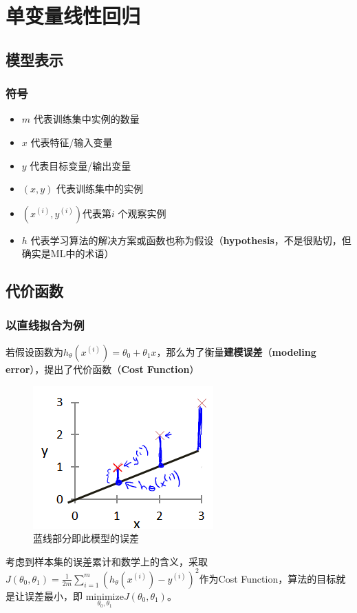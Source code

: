 \documentclass[../main.tex]{subfiles}
\begin{document}
\chapter{单变量线性回归}
\section{模型表示}
\subsection{符号}
\begin{itemize}
    \item \(m\) 代表训练集中实例的数量
    \item \(x\) 代表特征/输入变量
    \item \(y\) 代表目标变量/输出变量
    \item \((x,y)\) 代表训练集中的实例
    \item \(({{x}^{(i)}},{{y}^{(i)}})\)代表第\(i\) 个观察实例
    \item \(h\) 代表学习算法的解决方案或函数也称为假设（\textbf{hypothesis}，不是很贴切，但确实是ML中的术语）
\end{itemize}


\section{代价函数}
\subsection{以直线拟合为例}
若假设函数为\(h_θ(x^{(i)}) = θ_0+θ_1x\)，那么为了衡量\textbf{建模误差}（\textbf{modeling error}），提出了代价函数（\textbf{Cost Function}）

\begin{figure}[H]
    \centering
    \includegraphics{./img/2.1误差.png}
    \caption{蓝线部分即此模型的误差}
\end{figure}
考虑到样本集的误差累计和数学上的含义，采取 \(J(θ_0,θ_1) = \frac{1}{2m}\sum\limits_{i=1}^m ( h_{θ}(x^{(i)})-y^{(i)} )^{2}\)作为Cost Function，算法的目标就是让误差最小，即 \(\underset{θ_0, θ_1}{\text{minimize}} J(θ_0, θ_1)\)。
\end{document}
